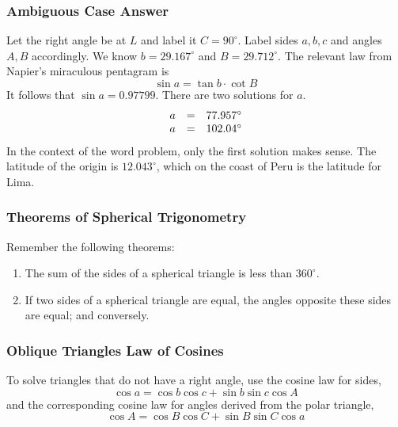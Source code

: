 \documentclass[xcolor=dvipsnames]{beamer}
\begin{document}
\begin{frame}
  \frametitle{Ambiguous Case Answer}
Let the right angle be at $L$ and label it $C=90^{\circ}$. Label sides
$a,b,c$ and angles $A,B$ accordingly. We know $b=29.167^{\circ}$ and
$B=29.712^{\circ}$. The relevant law from Napier's miraculous
pentagram is
\begin{equation}
  \label{eq:saavooba}
  \sin{}a=\tan{}b\cdot\cot{}B
\end{equation}
It follows that $\sin{}a=0.97799$. There are two solutions for $a$.
\begin{equation}
  \label{eq:oongiemi}
  \begin{array}{rcl}
    a&=&77.957^{\circ} \\
    a&=&102.04^{\circ}
  \end{array}\notag
\end{equation}
In the context of the word problem, only the first solution makes
sense. The latitude of the origin is $12.043^{\circ}$, which on the
coast of Peru is the latitude for Lima.
\end{frame}

\begin{frame}
  \frametitle{Theorems of Spherical Trigonometry}
  Remember the following theorems:
  \begin{enumerate}
  \item The sum of the sides of a spherical triangle is less than
    $360^{\circ}$.
  \item If two sides of a spherical triangle are equal, the angles
    opposite these sides are equal; and conversely.
  \end{enumerate}
\end{frame}

\begin{frame}
  \frametitle{Oblique Triangles Law of Cosines}
To solve triangles that do not have a right angle, use the cosine law
for sides,
\begin{equation}
  \label{eq:epheepee}
  \cos{}a=\cos{}b\cos{}c+\sin{}b\sin{}c\cos{}A
\end{equation}
and the corresponding cosine law for angles derived from the polar
triangle,
\begin{equation}
  \label{eq:dijeeghe}
  \cos{}A=\cos{}B\cos{}C+\sin{}B\sin{}C\cos{}a
\end{equation}
\end{frame}
\end{document}
